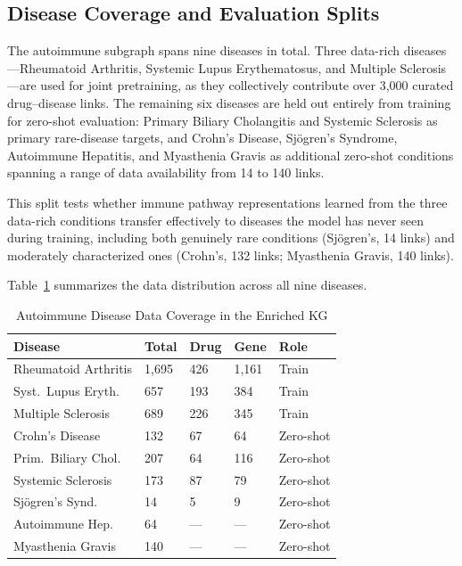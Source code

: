 \documentclass[conference]{IEEEtran}
\begin{document}
\subsection{Disease Coverage and Evaluation Splits}

The autoimmune subgraph spans nine diseases in total. Three data-rich diseases---Rheumatoid Arthritis, Systemic Lupus Erythematosus, and Multiple Sclerosis---are used for joint pretraining, as they collectively contribute over 3,000 curated drug--disease links. The remaining six diseases are held out entirely from training for zero-shot evaluation: Primary Biliary Cholangitis and Systemic Sclerosis as primary rare-disease targets, and Crohn's Disease, Sj\"{o}gren's Syndrome, Autoimmune Hepatitis, and Myasthenia Gravis as additional zero-shot conditions spanning a range of data availability from 14 to 140 links.

This split tests whether immune pathway representations learned from the three data-rich conditions transfer effectively to diseases the model has never seen during training, including both genuinely rare conditions (Sj\"{o}gren's, 14 links) and moderately characterized ones (Crohn's, 132 links; Myasthenia Gravis, 140 links).

Table~\ref{tab:disease_coverage} summarizes the data distribution across all nine diseases.

\begin{table}[!t]
\caption{Autoimmune Disease Data Coverage in the Enriched KG}
\label{tab:disease_coverage}
\centering
\footnotesize
\renewcommand{\arraystretch}{1.4}
\begin{tabular}{p{2.3cm}p{0.7cm}p{0.7cm}p{0.7cm}p{1.8cm}}
\toprule
\textbf{Disease} & \textbf{Total} & \textbf{Drug} & \textbf{Gene} & \textbf{Role} \\
\midrule
Rheumatoid Arthritis & 1,695 & 426 & 1,161 & Train \\
Syst.\ Lupus Eryth. & 657 & 193 & 384 & Train \\
Multiple Sclerosis & 689 & 226 & 345 & Train \\
\midrule
Crohn's Disease & 132 & 67 & 64 & Zero-shot \\
Prim.\ Biliary Chol. & 207 & 64 & 116 & Zero-shot \\
Systemic Sclerosis & 173 & 87 & 79 & Zero-shot \\
Sj\"{o}gren's Synd. & 14 & 5 & 9 & Zero-shot \\
Autoimmune Hep. & 64 & --- & --- & Zero-shot \\
Myasthenia Gravis & 140 & --- & --- & Zero-shot \\
\bottomrule
\end{tabular}
\end{table}
\end{document}

